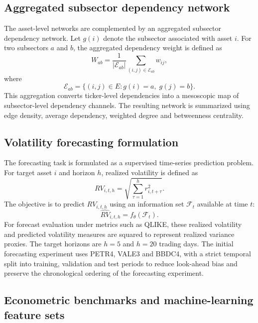 \subsection{Aggregated subsector dependency network}
\label{subsec:subsector_network_method}

The asset-level networks are complemented by an aggregated subsector dependency network. Let $g(i)$ denote the subsector associated with asset $i$. For two subsectors $a$ and $b$, the aggregated dependency weight is defined as
\begin{equation}
W_{ab}
=
\frac{1}{|\mathcal{E}_{ab}|}
\sum_{(i,j)\in \mathcal{E}_{ab}}
w_{ij},
\end{equation}
where
\begin{equation}
\mathcal{E}_{ab}
=
\{(i,j)\in E : g(i)=a,\; g(j)=b\}.
\end{equation}
This aggregation converts ticker-level dependencies into a mesoscopic map of subsector-level dependency channels. The resulting network is summarized using edge density, average dependency, weighted degree and betweenness centrality.

\subsection{Volatility forecasting formulation}
\label{subsec:forecasting_method}

The forecasting task is formulated as a supervised time-series prediction problem. For target asset $i$ and horizon $h$, realized volatility is defined as
\begin{equation}
RV_{i,t,h}
=
\sqrt{
\sum_{\tau=1}^{h}
r_{i,t+\tau}^{2}
}.
\end{equation}
The objective is to predict $RV_{i,t,h}$ using an information set $\mathcal{F}_t$ available at time $t$:
\begin{equation}
\widehat{RV}_{i,t,h}
=
f_{\theta}(\mathcal{F}_t).
\end{equation}
For forecast evaluation under metrics such as QLIKE, these realized volatility and predicted volatility measures are squared to represent realized variance proxies. The target horizons are $h=5$ and $h=20$ trading days. The initial forecasting experiment uses PETR4, VALE3 and BBDC4, with a strict temporal split into training, validation and test periods to reduce look-ahead bias and preserve the chronological ordering of the forecasting experiment.

\subsection{Econometric benchmarks and machine-learning feature sets}
\label{subsec:forecast_models_method}

